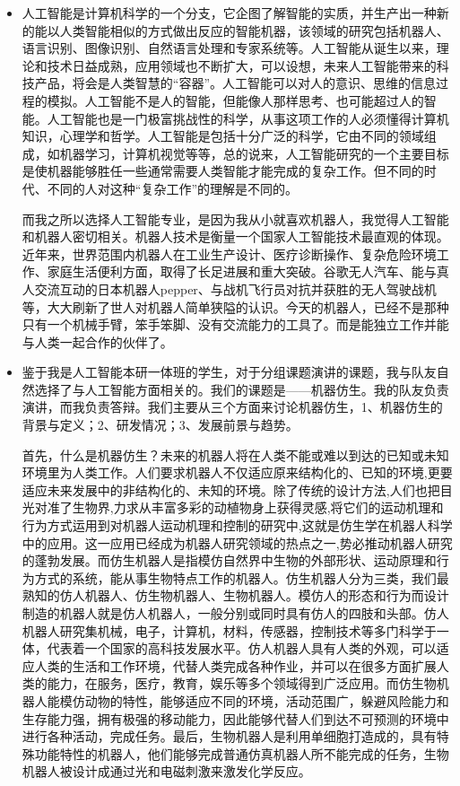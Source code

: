 \documentclass{article}
\begin{document}
\begin{itemize}
    \item 人工智能是计算机科学的一个分支，它企图了解智能的实质，并生产出一种新的能以人类智能相似的方式做出反应的智能机器，该领域的研究包括机器人、语言识别、图像识别、自然语言处理和专家系统等。人工智能从诞生以来，理论和技术日益成熟，应用领域也不断扩大，可以设想，未来人工智能带来的科技产品，将会是人类智慧的“容器”。人工智能可以对人的意识、思维的信息过程的模拟。人工智能不是人的智能，但能像人那样思考、也可能超过人的智能。人工智能也是一门极富挑战性的科学，从事这项工作的人必须懂得计算机知识，心理学和哲学。人工智能是包括十分广泛的科学，它由不同的领域组成，如机器学习，计算机视觉等等，总的说来，人工智能研究的一个主要目标是使机器能够胜任一些通常需要人类智能才能完成的复杂工作。但不同的时代、不同的人对这种“复杂工作”的理解是不同的。\par 而我之所以选择人工智能专业，是因为我从小就喜欢机器人，我觉得人工智能和机器人密切相关。机器人技术是衡量一个国家人工智能技术最直观的体现。近年来，世界范围内机器人在工业生产设计、医疗诊断操作、复杂危险环境工作、家庭生活便利方面，取得了长足进展和重大突破。谷歌无人汽车、能与真人交流互动的日本机器人pepper、与战机飞行员对抗并获胜的无人驾驶战机等，大大刷新了世人对机器人简单狭隘的认识。今天的机器人，已经不是那种只有一个机械手臂，笨手笨脚、没有交流能力的工具了。而是能独立工作并能与人类一起合作的伙伴了。 
    \item 鉴于我是人工智能本研一体班的学生，对于分组课题演讲的课题，我与队友自然选择了与人工智能方面相关的。我们的课题是——机器仿生。我的队友负责演讲，而我负责答辩。我们主要从三个方面来讨论机器仿生，1、机器仿生的背景与定义；2、研发情况；3、发展前景与趋势。\par 首先，什么是机器仿生？未来的机器人将在人类不能或难以到达的已知或未知环境里为人类工作。人们要求机器人不仅适应原来结构化的、已知的环境,更要适应未来发展中的非结构化的、未知的环境。除了传统的设计方法,人们也把目光对准了生物界,力求从丰富多彩的动植物身上获得灵感,将它们的运动机理和行为方式运用到对机器人运动机理和控制的研究中,这就是仿生学在机器人科学中的应用。这一应用已经成为机器人研究领域的热点之一,势必推动机器人研究的蓬勃发展。而仿生机器人是指模仿自然界中生物的外部形状、运动原理和行为方式的系统，能从事生物特点工作的机器人。仿生机器人分为三类，我们最熟知的仿人机器人、仿生物机器人、生物机器人。模仿人的形态和行为而设计制造的机器人就是仿人机器人，一般分别或同时具有仿人的四肢和头部。仿人机器人研究集机械，电子，计算机，材料，传感器，控制技术等多门科学于一体，代表着一个国家的高科技发展水平。仿人机器人具有人类的外观，可以适应人类的生活和工作环境，代替人类完成各种作业，并可以在很多方面扩展人类的能力，在服务，医疗，教育，娱乐等多个领域得到广泛应用。而仿生物机器人能模仿动物的特性，能够适应不同的环境，活动范围广，躲避风险能力和生存能力强，拥有极强的移动能力，因此能够代替人们到达不可预测的环境中进行各种活动，完成任务。最后，生物机器人是利用单细胞打造成的，具有特殊功能特性的机器人，他们能够完成普通仿真机器人所不能完成的任务，生物机器人被设计成通过光和电磁刺激来激发化学反应。

\end{itemize}
\end{document}
